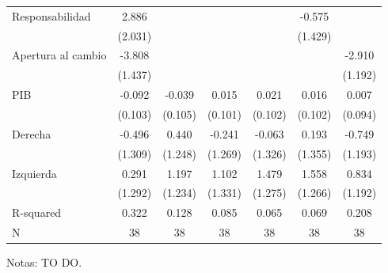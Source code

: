 \begin{table}[h]
{{\begin{threeparttable}
\begin{tabular}{l*{6}{S}}
						Responsabilidad     &       2.886         &                     &                     &                     &      -0.575         &                     \\
						&     (2.031)         &                     &                     &                     &     (1.429)         &                     \\
						Apertura al cambio  &      -3.808\sym{**} &                     &                     &                     &                     &      -2.910\sym{**} \\
						&     (1.437)         &                     &                     &                     &                     &     (1.192)         \\
						PIB                 &      -0.092         &      -0.039         &       0.015         &       0.021         &       0.016         &       0.007         \\
						&     (0.103)         &     (0.105)         &     (0.101)         &     (0.102)         &     (0.102)         &     (0.094)         \\
						Derecha             &      -0.496         &       0.440         &      -0.241         &      -0.063         &       0.193         &      -0.749         \\
						&     (1.309)         &     (1.248)         &     (1.269)         &     (1.326)         &     (1.355)         &     (1.193)         \\
						Izquierda           &       0.291         &       1.197         &       1.102         &       1.479         &       1.558         &       0.834         \\
						&     (1.292)         &     (1.234)         &     (1.331)         &     (1.275)         &     (1.266)         &     (1.192)         \\
						\midrule
						R-squared           &       0.322         &       0.128         &       0.085         &       0.065         &       0.069         &       0.208         \\
						N                   &          38         &          38         &          38         &          38         &          38         &          38         \\
						\hline\hline
					\end{tabular}
					\begin{tablenotes}
						\footnotesize{Notas: TO DO.}
					\end{tablenotes}
				\end{threeparttable}
			}
		}
	\end{table}